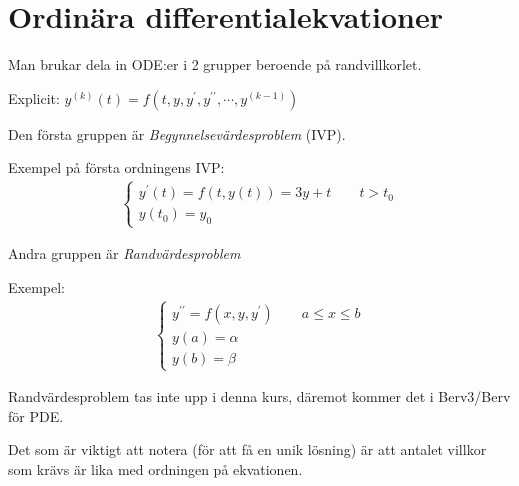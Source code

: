 \section{Ordinära differentialekvationer}
\par\bigskip
\noindent Man brukar dela in ODE:er i 2 grupper beroende på randvillkorlet.\par
\noindent Explicit: $y^{(k)}(t)=f(t,y, y^{\prime}, y^{\prime\prime},\cdots,y^{(k-1)})$
\par\bigskip
\noindent Den första gruppen är \textit{Begynnelsevärdesproblem} (IVP).\par
\noindent Exempel på första ordningens IVP:
\begin{equation*}
  \begin{gathered}
    \begin{cases*}
      y^{\prime}(t)=f(t,y(t)) = 3y+t\qquad t>t_0\\
      y(t_0) = y_0
    \end{cases*}
  \end{gathered}
\end{equation*}
\par\bigskip
\noindent Andra gruppen är \textit{Randvärdesproblem}\par
\noindent Exempel:
\begin{equation*}
  \begin{gathered}
    \begin{cases*}
      y^{\prime\prime}=f(x,y,y^{\prime})\qquad a\leq x\leq b\\
      y(a) = \alpha\\
      y(b) = \beta
    \end{cases*}
  \end{gathered}
\end{equation*}
\par\bigskip
\noindent Randvärdesproblem tas inte upp i denna kurs, däremot kommer det i Berv3/Berv för PDE.
\par\bigskip
\noindent Det som är viktigt att notera (för att få en unik lösning) är att antalet villkor som krävs är lika med ordningen på ekvationen.
\par\bigskip
